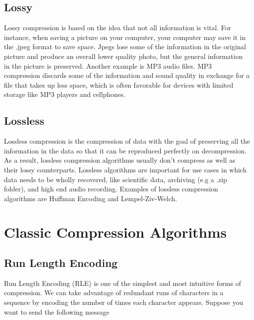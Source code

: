 \documentclass[12pt,twoside]{reedthesis}
\begin{document}
\hypertarget{lossy}{%
\subsection{Lossy}\label{lossy}}

Lossy compression is based on the idea that not all information is vital. For instance, when saving a picture on your computer, your computer may save it in the .jpeg format to save space. Jpegs lose some of the information in the original picture and produce an overall lower quality photo, but the general information in the picture is preserved. Another example is MP3 audio files. MP3 compression discards some of the information and sound quality in exchange for a file that takes up less space, which is often favorable for devices with limited storage like MP3 players and cellphones.

\hypertarget{lossless}{%
\subsection{Lossless}\label{lossless}}

Lossless compression is the compression of data with the goal of preserving all the information in the data so that it can be reproduced perfectly on decompression. As a result, lossless compression algorithms usually don't compress as well as their lossy counterparts. Lossless algorithms are important for use cases in which data needs to be wholly recovered, like scientific data, archiving (e.g a .zip folder), and high end audio recording. Examples of lossless compression algorithms are Huffman Encoding and Lempel-Ziv-Welch.

\hypertarget{classic-compression-algorithms}{%
\section{Classic Compression Algorithms}\label{classic-compression-algorithms}}

\hypertarget{run-length-encoding}{%
\subsection{Run Length Encoding}\label{run-length-encoding}}

Run Length Encoding (RLE) is one of the simplest and most intuitive forms of compression. We can take advantage of redundant runs of characters in a sequence by encoding the number of times each character appears.
Suppose you want to send the following message
\end{document}
